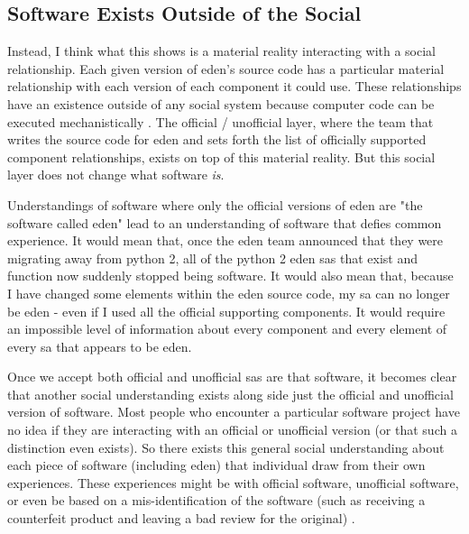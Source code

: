 \documentclass[a4paper,man,natbib,floatsintext]{apa6}
\begin{document}
   \subsection{Software Exists Outside of the Social}
   Instead, I think what this shows is a material reality interacting with a social relationship. Each given version of \acrshort{eden}'s source code has a particular material relationship with each version of each component it could use. These relationships have an existence outside of any social system because computer code can be executed mechanistically \citep{Cox2013-zo}. The official / unofficial layer, where the team that writes the source code for \acrshort{eden} and sets forth the list of officially supported component relationships, exists on top of this material reality. But this social layer does not change what software \textit{is}.

   Understandings of software where only the official versions of \acrshort{eden} are "the software called \acrshort{eden}" lead to an understanding of software that defies common experience. It would mean that, once the \acrshort{eden} team announced that they were migrating away from \gls{python} 2, all of the \gls{python} 2 \acrshort{eden} \glspl{sa} that exist and function now suddenly stopped being software. It would also mean that, because I have changed some elements within the \acrshort{eden} source code, my \gls{sa} can no longer be \acrshort{eden} - even if I used all the official supporting components. It would require an impossible level of information about every component and every element of every \gls{sa} that appears to be \acrshort{eden}.

   Once we accept both official and unofficial \glspl{sa} are that software, it becomes clear that another social understanding exists along side just the official and unofficial version of software. Most people who encounter a particular software project have no idea if they are interacting with an official or unofficial version (or that such a distinction even exists). So there exists this general social understanding about each piece of software (including \acrshort{eden}) that individual draw from their own experiences. These experiences might be with official software, unofficial software, or even be based on a mis-identification of the software (such as receiving a counterfeit product and leaving a bad review for the original) \citep{Suthivarakom2020-cp}.
\end{document}
